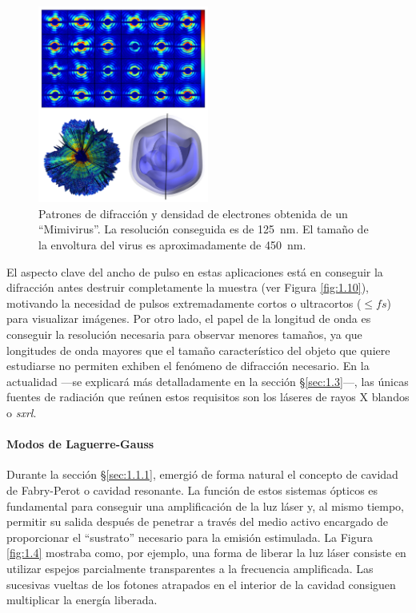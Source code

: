 \begin{figure}[htpb]
  \centering
  \includegraphics[width=0.5\textwidth]{Figuras/ch1_pulso.png}
  \caption{Patrones de difracción y densidad de electrones obtenida de un \enquote{Mimivirus}\autocite{Ekeberg2015}. La resolución conseguida es de \qty{125}{nm}. El tamaño de la envoltura del virus es aproximadamente de \qty{450}{nm}.}
  \label{fig:1.9}
\end{figure}

El aspecto clave del ancho de pulso en estas aplicaciones está en conseguir la difracción antes destruir completamente la muestra\autocite{Neutze2000} (ver Figura \ref{fig:1.10}), motivando la necesidad de pulsos extremadamente cortos o ultracortos ($\le\unit{fs}$) para visualizar imágenes. Por otro lado, el papel de la longitud de onda es conseguir la resolución necesaria para observar menores tamaños, ya que longitudes de onda mayores que el tamaño característico del objeto que quiere estudiarse no permiten exhiben el fenómeno de difracción necesario. En la actualidad ---se explicará más detalladamente en la sección \S\ref{sec:1.3}---, las únicas fuentes de radiación que reúnen estos requisitos son los láseres de rayos X blandos o \emph{\acrfull{sxrl}}.

\paragraph{Modos de Laguerre-Gauss}
Durante la sección \S\ref{sec:1.1.1}, emergió de forma natural el concepto de cavidad de Fabry-Perot o cavidad resonante. La función de estos sistemas ópticos es fundamental para conseguir una amplificación de la luz láser y, al mismo tiempo, permitir su salida después de penetrar a través del medio activo encargado de proporcionar el \enquote{sustrato} necesario para la emisión estimulada. La Figura \ref{fig:1.4} mostraba como, por ejemplo, una forma de liberar la luz láser consiste en utilizar espejos parcialmente transparentes a la frecuencia amplificada. Las sucesivas vueltas de los fotones atrapados en el interior de la cavidad consiguen multiplicar la energía liberada. 

